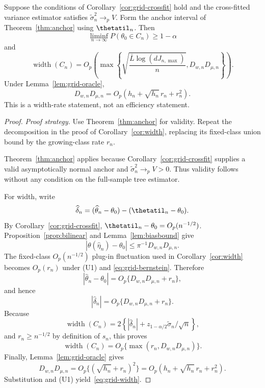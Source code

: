 \begin{corollary}
\label{cor:grid-width}
Suppose the conditions of Corollary~\ref{cor:grid-crossfit} hold and the
cross-fitted variance estimator satisfies
$\widetilde\sigma_n^2\to_pV$.  Form the anchor interval of
Theorem~\ref{thm:anchor} using $\thetatil_n$.  Then
\[
 \liminf_{n\to\infty}P(\theta_0\in C_n)\ge1-\alpha
\]
and
\begin{equation}\label{eq:grid-width}
 \operatorname{width}(C_n)
 =O_p\!\left(
   \max\left\{
     \sqrt{\frac{\bar L\log(dJ_{n,\max})}{n}},
     D_{w,n}D_{\mu,n}
   \right\}
 \right).
\end{equation}
Under Lemma~\ref{lem:grid-oracle},
\[
 D_{w,n}D_{\mu,n}
 =O_p\left(h_n+\sqrt{h_n}\,r_n+r_n^2\right).
\]
This is a width-rate statement, not an efficiency statement.
\end{corollary}

\begin{proof}
\emph{Proof strategy.}
Use Theorem~\ref{thm:anchor} for validity.  Repeat the decomposition in the
proof of Corollary~\ref{cor:width}, replacing its fixed-class union bound by
the growing-class rate $r_n$.

Theorem~\ref{thm:anchor} applies because
Corollary~\ref{cor:grid-crossfit} supplies a valid asymptotically normal anchor
and $\widetilde\sigma_n^2\to_pV>0$.  Thus validity follows without any
condition on the full-sample tree estimator.

For width, write
\[
 \widehat\delta_n
 =(\widehat\theta_n-\theta_0)-(\thetatil_n-\theta_0).
\]
By Corollary~\ref{cor:grid-crossfit},
$\thetatil_n-\theta_0=O_p(n^{-1/2})$.  Proposition~\ref{prop:bilinear} and
Lemma~\ref{lem:biasbound} give
\[
 |\theta(\widehat\eta_n)-\theta_0|
 \le\pi^{-1}D_{w,n}D_{\mu,n}.
\]
The fixed-class $O_p(n^{-1/2})$ plug-in fluctuation used in
Corollary~\ref{cor:width} becomes $O_p(r_n)$ under (U1) and
\eqref{eq:grid-bernstein}.  Therefore
\[
 |\widehat\theta_n-\theta_0|
 =O_p\{D_{w,n}D_{\mu,n}+r_n\},
\]
and hence
\[
 |\widehat\delta_n|
 =O_p\{D_{w,n}D_{\mu,n}+r_n\}.
\]
Because
\[
 \operatorname{width}(C_n)
 =2\left\{|\widehat\delta_n|
   +z_{1-\alpha/2}\widetilde\sigma_n/\sqrt n\right\},
\]
and $r_n\ge n^{-1/2}$ by definition of $s_n$, this proves
\[
 \operatorname{width}(C_n)
 =O_p\{\max(r_n,D_{w,n}D_{\mu,n})\}.
\]
Finally, Lemma~\ref{lem:grid-oracle} gives
\[
 D_{w,n}D_{\mu,n}
 =O_p\{(\sqrt{h_n}+r_n)^2\}
 =O_p(h_n+\sqrt{h_n}\,r_n+r_n^2).
\]
Substitution and (U1) yield~\eqref{eq:grid-width}.
\end{proof}

